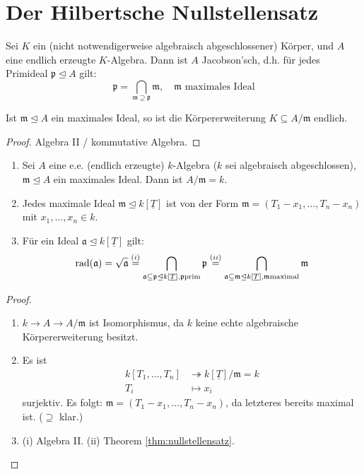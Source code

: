 
\section{Der Hilbertsche Nullstellensatz}
\label{sec:nullstellensatz}
\begin{thm}
  \label{thm:nullstellensatz}
  Sei $K$ ein (nicht notwendigerweise algebraisch abgeschlossener) Körper,
  und $A$ eine endlich erzeugte $K$-Algebra. Dann ist $A$ Jacobson'sch,
  d.h. für jedes Primideal $\mathfrak{p}\unlhd A$ gilt:
  \[
    \mathfrak{p}=\bigcap_{\mathfrak{m}\supseteq\mathfrak{p}}\mathfrak{m},\quad\mathfrak{m}\text{ maximales Ideal}
  \]

  Ist $\mathfrak{m}\unlhd A$ ein maximales Ideal, so ist die Körpererweiterung
  $K\subseteq A/\mathfrak{m}$ endlich.
\end{thm}
\begin{proof}
  Algebra II / kommutative Algebra.
\end{proof}
\begin{cor}
  \label{cor:nullstellensatz}
  \mbox{}
  \begin{enumerate}
  \item Sei $A$ eine e.e. (endlich erzeugte) $k$-Algebra ($k$ sei algebraisch
    abgeschlossen), $\mathfrak{m}\unlhd A$ ein maximales Ideal. Dann
    ist $A/\mathfrak{m}=k$. 
  \item Jedes maximale Ideal $\mathfrak{m}\unlhd k[\underline{T}]$ ist von der
    Form $\mathfrak{m}=(T_{1}-x_{1},\ldots,T_{n}-x_{n})$ mit $x_{1},\ldots,x_{n}\in k$.
  \item Für ein Ideal  $\mathfrak{a}\unlhd k[\underline{T}]$ gilt:
    \[
      \operatorname{rad}(\mathfrak{a})=\sqrt{\mathfrak{a}}\overset{(i)}{=}\bigcap_{\mathfrak{a}\subseteq\mathfrak{p}\unlhd k[\underline{T}], \mathfrak{p} \text{prim}}\mathfrak{p}\overset{(ii)}{=}\bigcap_{\mathfrak{a}\subseteq\mathfrak{m}\unlhd k[\underline{T}], \mathfrak{m} \text{maximal}}\mathfrak{m}
    \]
  \end{enumerate}
\end{cor}
\begin{proof}
  \mbox{}
  \begin{enumerate}
  \item $k\rightarrow A\rightarrow A/\mathfrak{m}$ ist Isomorphismus,  da
    $k$ keine echte algebraische Körpererweiterung besitzt.
  \item Es ist
    \begin{align*}
      k[T_{1},\ldots,T_{n}] & \twoheadrightarrow k[\underline{T}]/\mathfrak{m}=k\\
      T_{i} & \mapsto x_{i}
    \end{align*}
    surjektiv. Es folgt: $\mathfrak{m}=(T_{1}-x_{1},\ldots,T_{n}-x_{n})$, da letzteres
    bereits maximal ist. ($\supseteq$ klar.)
  \item (i) Algebra II. (ii) Theorem \ref{thm:nullstellensatz}.
  \end{enumerate}
\end{proof}

